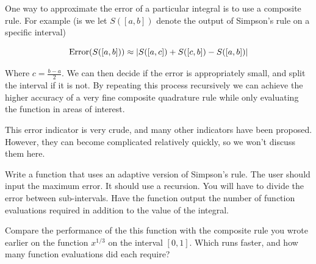 One way to approximate the error of a particular integral is to use a composite rule.
For example (is we let $S([a,b])$ denote the output of Simpson's rule on a specific interval)

\[
\mbox{Error}(S([a,b])) \approx \left\lvert S([a,c]) + S([c,b]) - S([a,b])\right\rvert
\]

Where $c = \frac{b-a}{2}$.
We can then decide if the error is appropriately small, and split the interval if it is not.
By repeating this process recursively we can achieve the higher accuracy of a very fine composite quadrature rule while only evaluating the function in areas of interest.

This error indicator is very crude, and many other indicators have been proposed.
However, they can become complicated relatively quickly, so we won't discuss them here. 

\begin{problem}
Write a function that uses an adaptive version of Simpson's rule.
The user should input the maximum error.
It should use a recursion.
You will have to divide the error between sub-intervals.
Have the function output the number of function evaluations required in addition to the value of the integral.

Compare the performance of the this function with the composite rule you wrote earlier on the function $x^{1/3}$ on the interval $[0,1]$.
Which runs faster, and how many function evaluations did each require?
\end{problem}
